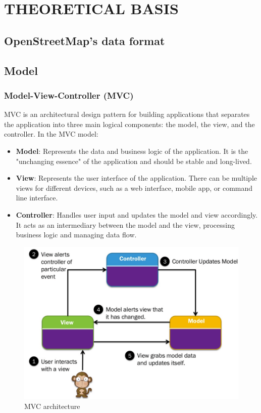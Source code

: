 \section{THEORETICAL BASIS}

\subsection{OpenStreetMap's data format}


\subsection{Model}

\subsubsection{Model-View-Controller (MVC)}

MVC is an architectural design pattern for building applications that separates the application into three main logical components: the model, the view, and the controller. In the MVC model:

\begin{itemize}
    \item \textbf{Model}: Represents the data and business logic of the application. It is the "unchanging essence" of the application and should be stable and long-lived.

    \item \textbf{View}: Represents the user interface of the application. There can be multiple views for different devices, such as a web interface, mobile app, or command line interface.

    \item \textbf{Controller}: Handles user input and updates the model and view accordingly. It acts as an intermediary between the model and the view, processing business logic and managing data flow.
\end{itemize}

\begin{figure}[H]
    \centering
    \includegraphics[width=\textwidth]{assets/images/Research/System/MVC.png}
    \caption{MVC architecture}
    \label{fig:mvc}
\end{figure}

